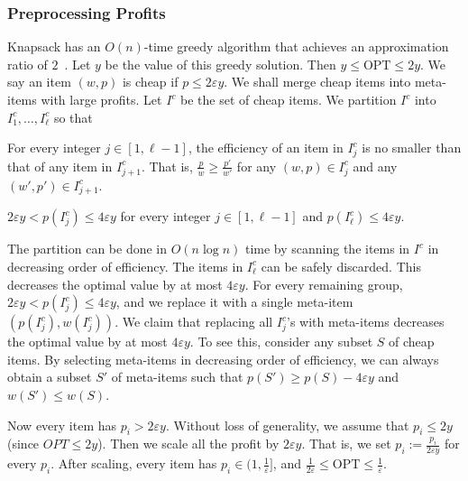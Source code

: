 \documentclass[a4paper,UKenglish,cleveref, autoref, thm-restate, pdfa]{lipics-v2021}
\newcommand{\eps}{\varepsilon}
\renewcommand{\leq}{\leqslant}
\renewcommand{\geq}{\geqslant}
\begin{document}
\subsubsection{Preprocessing Profits}
Knapsack has an $O(n)$-time greedy algorithm that achieves an approximation ratio of $2$~\cite[Section 2.5]{KPD04}. Let $y$ be the value of this greedy solution. Then $y \leq \mathrm{OPT} \leq 2y$. We say an item $(w, p)$ is cheap if $p \leq 2\eps y$. We shall merge cheap items into meta-items with large profits.  Let $I^c$ be the set of cheap items. We partition $I^c$ into $I^c_1, \ldots, I^c_\ell$ so that
\begin{romanenumerate}
    \item For every integer $j \in [1, \ell-1]$, the efficiency of an item in $I^c_j$ is no smaller than that of any item in $I^c_{j+1}$. That is, $\frac{p}{w} \geq \frac{p'}{w'}$ for any $(w, p) \in I^c_j$ and any $(w', p') \in I^c_{j+1}$.

    \item $2\eps y < p(I^c_j) \leq 4\eps y$ for every integer $j \in [1, \ell - 1]$ and $p(I^c_\ell) \leq 4\eps y$. 
\end{romanenumerate}
The partition can be done in $O(n \log n)$ time by scanning the items in $I^c$ in decreasing order of efficiency. The items in $I^c_\ell$ can be safely discarded. This decreases the optimal value by at most $4\eps y$.  For every remaining group, $2\eps y < p(I^c_j) \leq 4\eps y$, and we replace it with a single meta-item $(p(I^c_j), w(I^c_j))$. We claim that replacing all $I^c_j$'s with meta-items decreases the optimal value by at most $4\eps y$. To see this, consider any subset $S$ of cheap items. By selecting meta-items in decreasing order of efficiency, we can always obtain a subset $S'$ of meta-items such that $p(S') \geq p(S) - 4\eps y$ and $w(S') \leq w(S)$.

Now every item has $p_i > 2\eps y$. Without loss of generality, we assume that $p_i \leq 2y$ (since $OPT \leq 2y$). Then we scale all the profit by $2\eps y$. That is, we set $p_i:=  \frac{p_i}{2\eps y} $ for every $p_i$.  After scaling, every item has $p_i \in (1, \frac{1}{\eps}]$, and $\frac{1}{2\eps} \leq \mathrm{OPT} \leq \frac{1}{\eps}$.
\end{document}
